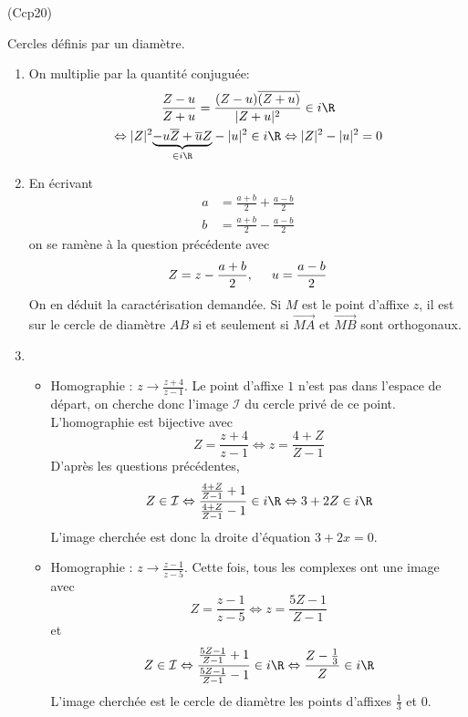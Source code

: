 \begin{tiny}(Ccp20)\end{tiny} Cercles définis par un diamètre.
\begin{enumerate}
  \item On multiplie par la quantité conjuguée:
\begin{multline*}
\frac{Z-u}{Z+u} =\frac{(Z-u)\overline{(Z+u)}}{|Z+u|^2}\in i\R\\
\Leftrightarrow
|Z|^2\underset{\in i\R}{\underbrace{-u\overline{Z}+\overline{u}Z}} -|u|^2\in i\R
\Leftrightarrow |Z|^2-|u|^2=0
\end{multline*}

  \item En écrivant
\begin{align*}
a &=  \frac{a+b}{2} + \frac{a-b}{2} \\ b &=  \frac{a+b}{2} - \frac{a-b}{2}  
\end{align*}
on se ramène à la question précédente avec 
\begin{displaymath}
  Z = z-\frac{a+b}{2}, \hspace{0.5cm} u= \frac{a-b}{2} 
\end{displaymath}
On en déduit la caractérisation demandée. Si $M$ est le point d'affixe $z$, il est sur le cercle de diamètre $AB$ si et seulement si $\overrightarrow{MA}$ et $\overrightarrow{MB}$ sont orthogonaux. 
  \item
\begin{itemize}
  \item Homographie : $z \rightarrow \frac{z+4}{z-1}$.\newline
Le point d'affixe $1$ n'est pas dans l'espace de départ, on cherche donc l'image $\mathcal{I}$ du cercle privé de ce point. L'homographie est bijective avec
\begin{displaymath}
  Z=\frac{z+4}{z-1} \Leftrightarrow z = \frac{4+Z}{Z-1}
\end{displaymath}
D'après les questions précédentes,
\begin{displaymath}
Z \in \mathcal{I} \Leftrightarrow \frac{\frac{4+Z}{Z-1} +1}{\frac{4+Z}{Z-1}-1}\in i\R  
\Leftrightarrow 3+2Z \in i \R
\end{displaymath}
L'image cherchée est donc la droite d'équation $3+2x = 0$.

  \item Homographie : $z \rightarrow \frac{z-1}{z-5}$.\newline
Cette fois, tous les complexes ont une image avec
\begin{displaymath}
 Z=\frac{z-1}{z-5}\Leftrightarrow z=\frac{5Z-1}{Z-1} 
\end{displaymath}
et
\begin{displaymath}
Z\in \mathcal{I}\Leftrightarrow \frac{\frac{5Z-1}{Z-1}+1}{\frac{5Z-1}{Z-1}-1}\in i\R  
\Leftrightarrow \frac{Z-\frac{1}{3}}{Z} \in i \R
\end{displaymath}
L'image cherchée est le cercle de diamètre les points d'affixes $\frac{1}{3}$ et $0$.
\end{itemize}

\end{enumerate}
